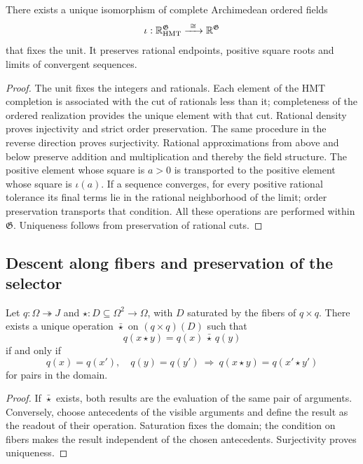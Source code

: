 \begin{proposition}
\label{hmtfg:carta-interna}
There exists a unique isomorphism of complete Archimedean ordered fields
\[
 \iota:\mathbb R_{\rm HMT}^{\mathfrak G}
             \xrightarrow{\ \cong\ }\mathbb R^{\mathfrak G}
\]
that fixes the unit. It preserves rational endpoints, positive square roots and limits of convergent sequences.
\end{proposition}
\begin{proof}
The unit fixes the integers and rationals. Each element of the HMT completion is associated with the cut of rationals less than it; completeness of the ordered realization provides the unique element with that cut. Rational density proves injectivity and strict order preservation. The same procedure in the reverse direction proves surjectivity. Rational approximations from above and below preserve addition and multiplication and thereby the field structure. The positive element whose square is \(a>0\) is transported to the positive element whose square is \(\iota(a)\). If a sequence converges, for every positive rational tolerance its final terms lie in the rational neighborhood of the limit; order preservation transports that condition. All these operations are performed within \(\mathfrak G\). Uniqueness follows from preservation of rational cuts.
\end{proof}

\subsection{Descent along fibers and preservation of the selector}
\label{hmtfg:descenso-selector}

\begin{proposition}
\label{hmtfg:criterio-descenso}
Let \(q:\Omega\twoheadrightarrow J\) and
\(\star:D\subseteq\Omega^2\to\Omega\), with \(D\) saturated by the fibers of \(q\times q\). There exists a unique operation \(\bar\star\) on \((q\times q)(D)\) such that
\[
 q(x\star y)=q(x)\,\bar\star\,q(y)
\]
if and only if
\[
 q(x)=q(x'),\quad q(y)=q(y')
 \ \Longrightarrow\ q(x\star y)=q(x'\star y')
\]
for pairs in the domain.
\end{proposition}
\begin{proof}
If \(\bar\star\) exists, both results are the evaluation of the same pair of arguments. Conversely, choose antecedents of the visible arguments and define the result as the readout of their operation. Saturation fixes the domain; the condition on fibers makes the result independent of the chosen antecedents. Surjectivity proves uniqueness.
\end{proof}

